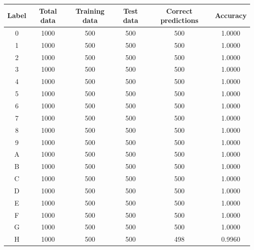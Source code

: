 \documentclass{article}
\begin{document}
\begin{center}
  \begin{table}[ht]
    \begin{tabular}{|c |c |c |c |c |c|}
      \hline
      Label & Total data & Training data & Test data & Correct predictions & Accuracy \\
      \hline
      0 & 1000 & 500 & 500 & 500 & 1.0000 \\
      
      1 & 1000 & 500 & 500 & 500 & 1.0000 \\
      
      2 & 1000 & 500 & 500 & 500 & 1.0000 \\
      
      3 & 1000 & 500 & 500 & 500 & 1.0000 \\
      
      4 & 1000 & 500 & 500 & 500 & 1.0000 \\
      
      5 & 1000 & 500 & 500 & 500 & 1.0000 \\
      
      6 & 1000 & 500 & 500 & 500 & 1.0000 \\
      
      7 & 1000 & 500 & 500 & 500 & 1.0000 \\
      
      8 & 1000 & 500 & 500 & 500 & 1.0000 \\
      
      9 & 1000 & 500 & 500 & 500 & 1.0000 \\
      
      A & 1000 & 500 & 500 & 500 & 1.0000 \\
      
      B & 1000 & 500 & 500 & 500 & 1.0000 \\
      
      C & 1000 & 500 & 500 & 500 & 1.0000 \\
      
      D & 1000 & 500 & 500 & 500 & 1.0000 \\
      
      E & 1000 & 500 & 500 & 500 & 1.0000 \\
      
      F & 1000 & 500 & 500 & 500 & 1.0000 \\
      
      G & 1000 & 500 & 500 & 500 & 1.0000 \\
      
      H & 1000 & 500 & 500 & 498 & 0.9960 \\
      

\end{tabular}
\end{table}
\end{center}
\end{document}
